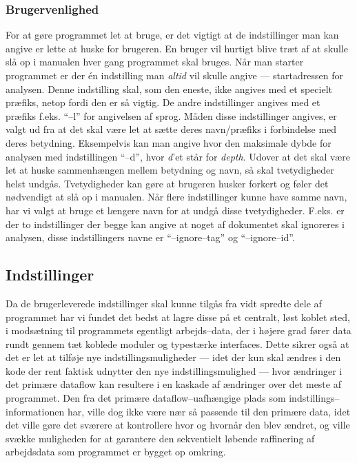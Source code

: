 \documentclass[a4paper,oneside]{memoir}
\begin{document}
\subsubsection{Brugervenlighed}
For at gøre programmet let at bruge, er det vigtigt at de
indstillinger man kan angive er lette at huske for brugeren. En bruger
vil hurtigt blive træt af at skulle slå op i manualen hver gang
programmet skal bruges. Når man starter programmet er der én
indstilling man \textit{altid} vil skulle angive --- startadressen for
analysen. Denne indstilling skal, som den eneste, ikke angives med et
specielt præfiks, netop fordi den er så vigtig. De andre indstillinger
angives med et præfiks f.eks. ``--l'' for angivelsen af sprog. Måden
disse indstillinger angives, er valgt ud fra at det skal være let at
sætte deres navn/præfiks i forbindelse med deres
betydning. Eksempelvis kan man angive hvor den maksimale dybde for
analysen med indstillingen ``--d'', hvor \textit{d}'et står for
\textit{depth}. Udover at det skal være let at huske sammenhængen mellem
betydning og navn, så skal tvetydigheder helst undgås. Tvetydigheder
kan gøre at brugeren husker forkert og føler det
nødvendigt at slå op i manualen. Når flere indstillinger kunne have
samme navn, har vi valgt at bruge et længere navn for at undgå
disse tvetydigheder. F.eks. er der to indstillinger der begge kan
angive at noget af dokumentet skal ignoreres i analysen, disse
indstillingers navne er ``--ignore--tag'' og ``--ignore--id''.

\subsection{Indstillinger}
Da de brugerleverede indstillinger skal kunne tilgås fra vidt spredte
dele af programmet har vi fundet det bedst at lagre disse på et
centralt, løst koblet sted, i modsætning til programmets egentligt
arbejds--data, der i højere grad fører data rundt gennem tæt koblede
moduler og typestærke interfaces. Dette sikrer også at det er let at
tilføje nye indstillingsmuligheder --- idet der kun skal ændres i den
kode der rent faktisk udnytter den nye indstillingsmulighed --- hvor
ændringer i det primære dataflow kan resultere i en kaskade af
ændringer over det meste af programmet. Den fra det primære
dataflow--uafhængige plads som indstillings--informationen har, ville
dog ikke være nær så passende til den primære data, idet det ville
gøre det sværere at kontrollere hvor og hvornår den blev ændret, og
ville svække muligheden for at garantere den sekventielt løbende
raffinering af arbejdsdata som programmet er bygget op omkring.
\end{document}
